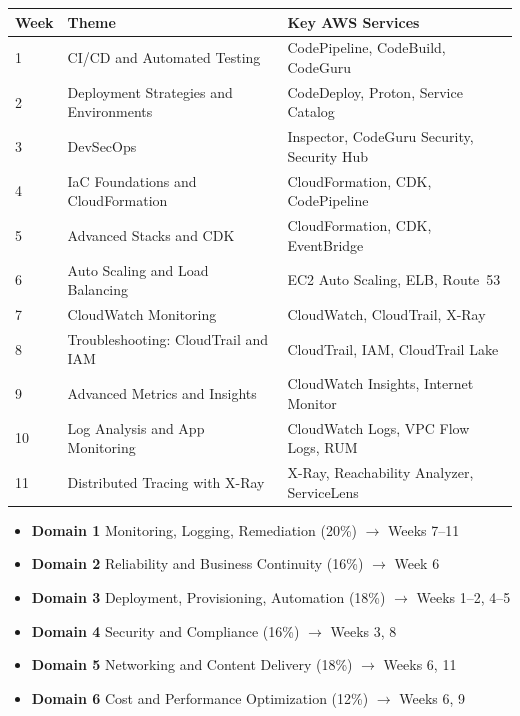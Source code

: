 \documentclass[12pt,a4paper]{article}
\begin{document}
\begin{center}
\renewcommand{\arraystretch}{1.5}
\begin{tabular}{|p{}|p{}|p{}|}
\hline
\textbf{Week} & \textbf{Theme} & \textbf{Key AWS Services} \\
\hline
1  & CI/CD and Automated Testing            & CodePipeline, CodeBuild, CodeGuru \\
\hline
2  & Deployment Strategies and Environments & CodeDeploy, Proton, Service Catalog \\
\hline
3  & DevSecOps                              & Inspector, CodeGuru Security, Security Hub \\
\hline
4  & IaC Foundations and CloudFormation     & CloudFormation, CDK, CodePipeline \\
\hline
5  & Advanced Stacks and CDK                & CloudFormation, CDK, EventBridge \\
\hline
6  & Auto Scaling and Load Balancing        & EC2 Auto Scaling, ELB, Route~53 \\
\hline
7  & CloudWatch Monitoring                  & CloudWatch, CloudTrail, X-Ray \\
\hline
8  & Troubleshooting: CloudTrail and IAM    & CloudTrail, IAM, CloudTrail Lake \\
\hline
9  & Advanced Metrics and Insights          & CloudWatch Insights, Internet Monitor \\
\hline
10 & Log Analysis and App Monitoring        & CloudWatch Logs, VPC Flow Logs, RUM \\
\hline
11 & Distributed Tracing with X-Ray         & X-Ray, Reachability Analyzer, ServiceLens \\
\hline
\end{tabular}
\end{center}

\vspace{1.5cm}

\begin{tcolorbox}[
  colback=lightgray, colframe=awsorange, arc=6pt,
  title={\textbf{Exam Alignment -- SysOps Administrator Associate (SOA-C02)}},
  fonttitle=\color{white}, colbacktitle=awsorange]
\begin{itemize}[leftmargin=1.5em, itemsep=2pt]
  \item \textbf{Domain 1} Monitoring, Logging, Remediation (20\%) $\rightarrow$ Weeks 7--11
  \item \textbf{Domain 2} Reliability and Business Continuity (16\%) $\rightarrow$ Week 6
  \item \textbf{Domain 3} Deployment, Provisioning, Automation (18\%) $\rightarrow$ Weeks 1--2, 4--5
  \item \textbf{Domain 4} Security and Compliance (16\%) $\rightarrow$ Weeks 3, 8
  \item \textbf{Domain 5} Networking and Content Delivery (18\%) $\rightarrow$ Weeks 6, 11
  \item \textbf{Domain 6} Cost and Performance Optimization (12\%) $\rightarrow$ Weeks 6, 9
\end{itemize}
\end{tcolorbox}
\end{document}
